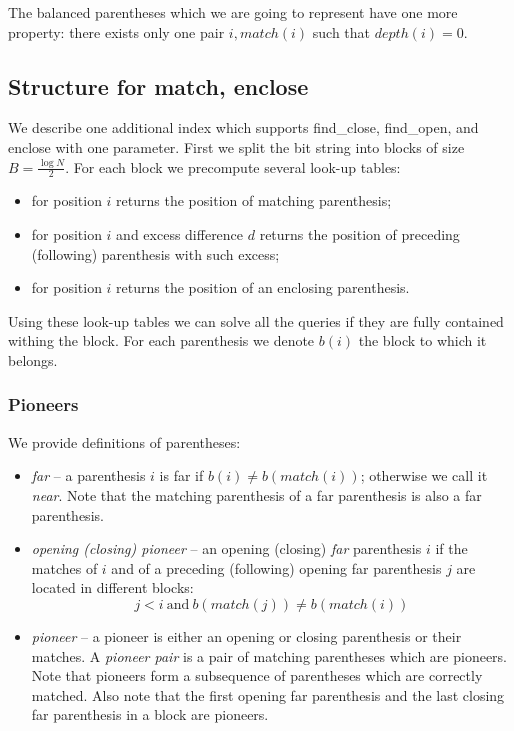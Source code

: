 The balanced parentheses which we are going to represent have one more property: there exists only one pair $i, match(i)$ such that $depth(i) =	 0$.

\subsection{Structure for match, enclose}

We describe one additional index which supports find\_close, find\_open, and enclose with one parameter.
First we split the bit string into blocks of size $B = \frac{\log N}{2}$.
For each block we precompute several look-up tables:
\begin{itemize}
	\item for position $i$ returns the position of matching parenthesis;
	\item for position $i$ and excess difference $d$ returns the position of preceding (following) parenthesis with such excess;
	\item for position $i$ returns the position of an enclosing parenthesis.
\end{itemize}

Using these look-up tables we can solve all the queries if they are fully contained withing the block.
For each parenthesis we denote $b(i)$ the block to which it belongs.

\subsubsection{Pioneers}

We provide definitions of parentheses:
\begin{itemize}
	\item \emph{far} -- a parenthesis $i$ is far if $b(i) \ne b(match(i))$; otherwise we call it \emph{near}.
	Note that the matching parenthesis of a far parenthesis is also a far parenthesis.
	\item \emph{opening (closing) pioneer} -- an opening (closing) \emph{far} parenthesis $i$ if the matches of $i$ and of a preceding (following) opening far parenthesis $j$ are located in different blocks:
	$$j < i\ \textrm{and}\ b(match(j)) \ne b(match(i))$$
	\item \emph{pioneer} -- a pioneer is either an opening or closing parenthesis or their matches.
	A \emph{pioneer pair} is a pair of matching parentheses which are pioneers.
	Note that pioneers form a subsequence of parentheses which are correctly matched.
	Also note that the first opening far parenthesis and the last closing far parenthesis in a block are pioneers.
\end{itemize}

